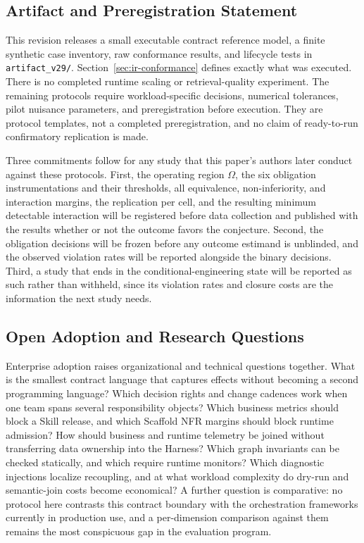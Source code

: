 \documentclass[11pt]{article}
\begin{document}
\subsection{Artifact and Preregistration Statement}

This revision releases a small executable contract reference model, a finite synthetic case inventory, raw conformance results, and lifecycle tests in \texttt{artifact\_v29/}. Section~\ref{sec:ir-conformance} defines exactly what was executed. There is no completed runtime scaling or retrieval-quality experiment. The remaining protocols require workload-specific decisions, numerical tolerances, pilot nuisance parameters, and preregistration before execution. They are protocol templates, not a completed preregistration, and no claim of ready-to-run confirmatory replication is made.

Three commitments follow for any study that this paper's authors later conduct against these protocols. First, the operating region $\Omega$, the six obligation instrumentations and their thresholds, all equivalence, non-inferiority, and interaction margins, the replication per cell, and the resulting minimum detectable interaction will be registered before data collection and published with the results whether or not the outcome favors the conjecture. Second, the obligation decisions will be frozen before any outcome estimand is unblinded, and the observed violation rates will be reported alongside the binary decisions. Third, a study that ends in the conditional-engineering state will be reported as such rather than withheld, since its violation rates and closure costs are the information the next study needs.

\subsection{Open Adoption and Research Questions}

Enterprise adoption raises organizational and technical questions together. What is the smallest contract language that captures effects without becoming a second programming language? Which decision rights and change cadences work when one team spans several responsibility objects? Which business metrics should block a Skill release, and which Scaffold NFR margins should block runtime admission? How should business and runtime telemetry be joined without transferring data ownership into the Harness? Which graph invariants can be checked statically, and which require runtime monitors? Which diagnostic injections localize recoupling, and at what workload complexity do dry-run and semantic-join costs become economical? A further question is comparative: no protocol here contrasts this contract boundary with the orchestration frameworks currently in production use, and a per-dimension comparison against them remains the most conspicuous gap in the evaluation program.
\end{document}
